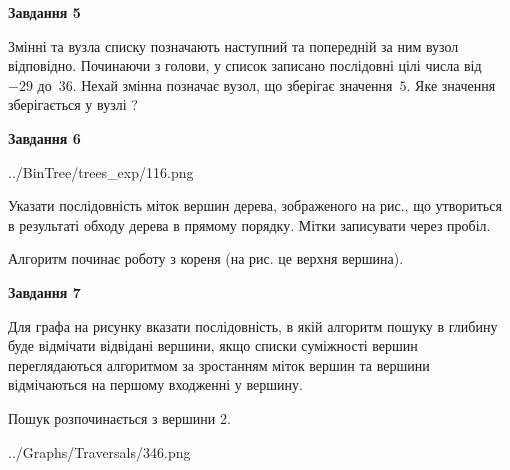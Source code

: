 \documentclass[12pt, ukrainian]{article}
\begin{document}
{\begin {large}
{\begin {center}\textbf{Завдання 5}\end {center}}\par
Змінні  та  вузла списку позначають наступний та попередній за ним вузол відповідно. Починаючи з голови, у список записано послідовні цілі числа від~$-29$ до~$36$. Нехай змінна  позначає вузол, що зберігає значення~$5$.
Яке значення зберігається у вузлі  ?\par
\newpage

{\begin {center}\textbf{Завдання 6}\end {center}}\par

\begin{center}
	{../BinTree/trees_exp/116.png}
\end{center}
Указати послідовність міток вершин дерева, зображеного на рис., що утвориться в результаті обходу дерева в прямому порядку. Мітки записувати через пробіл.\par Алгоритм починає роботу з кореня (на рис. це верхня вершина).\par
\newpage

{\begin {center}\textbf{Завдання 7}\end {center}}\par
Для графа на рисунку вказати послідовність, в якій алгоритм пошуку в глибину буде відмічати відвідані вершини, якщо списки суміжності вершин переглядаються алгоритмом за зростанням міток вершин та вершини відмічаються на першому вход\-женні у вершину.\par
Пошук розпочинається з вершини 2.\par

\begin{center}
	{../Graphs/Traversals/346.png}
\end{center}\par
\newpage


\end{large}}
\end{document}
